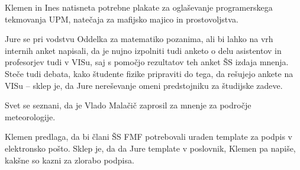 \documentclass{seja}
\begin{document}
\begin{ad}
\item
Klemen in Ines natisneta potrebne plakate za oglaševanje programerskega tekmovanja UPM, natečaja za mafijsko majico in prostovoljstva.

Jure se pri vodstvu Oddelka za matematiko pozanima, ali bi lahko na vrh internih anket napisali, da je nujno izpolniti tudi anketo o delu asistentov in profesorjev tudi v VISu, saj s pomočjo rezultatov teh anket ŠS izdaja mnenja. Steče tudi debata, kako študente fizike pripraviti do tega, da rešujejo ankete na VISu -- sklep je, da Jure nereševanje omeni predstojniku za študijske zadeve.

Svet se seznani, da je Vlado Malačič zaprosil za mnenje za področje meteorologije.

Klemen predlaga, da bi člani ŠS FMF potrebovali uraden template za podpis v elektronsko pošto. Sklep je, da da Jure template v poslovnik, Klemen pa napiše, kakšne so kazni za zlorabo podpisa.

\end{ad}

\makeatletter \global\let\@enddocumenthook\@empty \makeatother
{}
\end{document}
